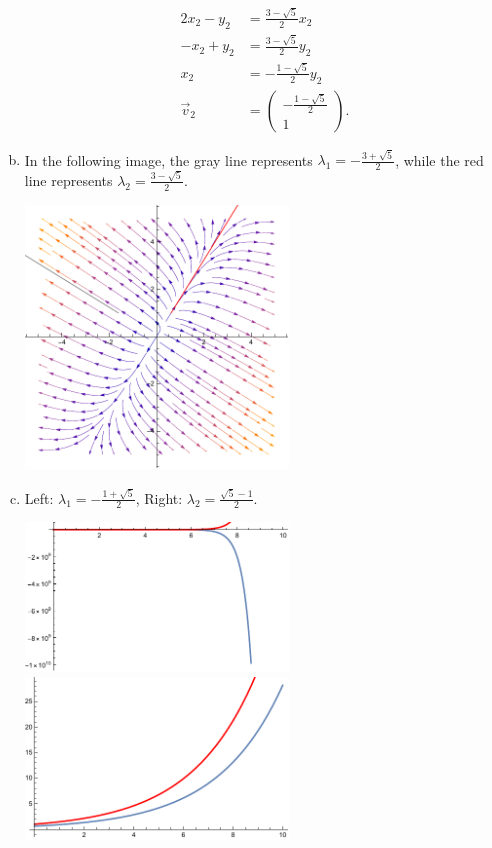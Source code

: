 \documentclass[10pt]{mypackage}
\begin{document}
\begin{enumerate}[(a)]
\begin{align*}
      2x_2 - y_2 &= \frac{3-\sqrt{5}}{2}x_2\\
      -x_2 + y_2 &= \frac{3-\sqrt{5}}{2}y_2\\
      x_2 &= -\frac{1-\sqrt{5}}{2}y_2\\
      \vec{v}_2 &= \begin{pmatrix}-\frac{1-\sqrt{5}}{2}\\ 1\end{pmatrix}.
    \end{align*}
  \item In the following image, the gray line represents $\lambda_1 = -\frac{3+\sqrt{5}}{2}$, while the red line represents $\lambda_2 = \frac{3 - \sqrt{5}}{2}$.
    \begin{center}
      \includegraphics[width=7cm]{images/3_2_8c.pdf}
    \end{center}
  \item Left: $\lambda_1 = -\frac{1+\sqrt{5}}{2}$, Right: $\lambda_2 = \frac{\sqrt{5} - 1}{2}$.
    \begin{center}
      \includegraphics[width=7cm]{images/3_2_8db.pdf} \includegraphics[width=7cm]{images/3_2_8da.pdf}

\end{center}
\end{enumerate}
\end{document}
